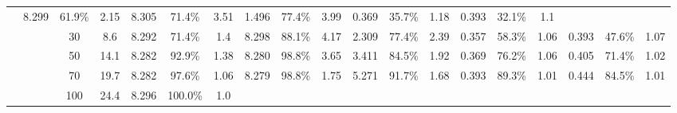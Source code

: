 \documentclass[letterpaper]{article}
\begin{document}
\begin{table*}[]
\begin{tabular}{|c|c|cc|ccc|ccc|ccc|ccc|ccc|}
		& 8.299 & 61.9\% & 2.15 	 

		& 8.305 & 71.4\% & 3.51 	 

		& 1.496 & 77.4\% & 3.99 	 

		& 0.369 & 35.7\% & 1.18 	 

		& 0.393 & 32.1\% & 1.1 	 

	\\ & & 30	 & 8.6

		& 8.292 & 71.4\% & 1.4 	 

		& 8.298 & 88.1\% & 4.17 	 

		& 2.309 & 77.4\% & 2.39 	 

		& 0.357 & 58.3\% & 1.06 	 

		& 0.393 & 47.6\% & 1.07 	 

	\\ & & 50	 & 14.1

		& 8.282 & 92.9\% & 1.38 	 

		& 8.280 & 98.8\% & 3.65 	 

		& 3.411 & 84.5\% & 1.92 	 

		& 0.369 & 76.2\% & 1.06 	 

		& 0.405 & 71.4\% & 1.02 	 

	\\ & & 70	 & 19.7

		& 8.282 & 97.6\% & 1.06 	 

		& 8.279 & 98.8\% & 1.75 	 

		& 5.271 & 91.7\% & 1.68 	 

		& 0.393 & 89.3\% & 1.01 	 

		& 0.444 & 84.5\% & 1.01 	 

	\\ & & 100	 & 24.4

		& 8.296 & 100.0\% & 1.0 	 


\end{tabular}
\end{table*}
\end{document}
